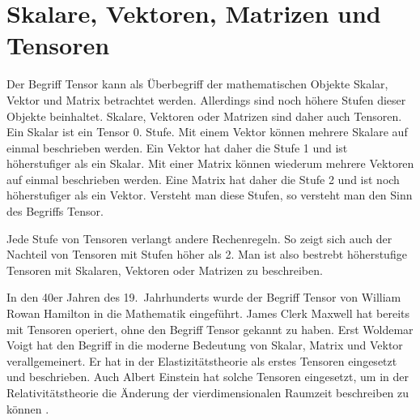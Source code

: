 \section{Skalare, Vektoren, Matrizen und Tensoren\label{spannung:section:Skalare,_Vektoren,_Matrizen_und_Tensoren}}
Der Begriff Tensor kann als Überbegriff der mathematischen Objekte Skalar, Vektor und Matrix betrachtet werden.
%
Allerdings sind noch höhere Stufen dieser Objekte beinhaltet.
Skalare, Vektoren oder Matrizen sind daher auch Tensoren.
Ein Skalar ist ein Tensor 0. Stufe.
%
Mit einem Vektor können mehrere Skalare auf einmal beschrieben werden.
Ein Vektor hat daher die Stufe 1 und ist höherstufiger als ein Skalar.
Mit einer Matrix können wiederum mehrere Vektoren auf einmal beschrieben werden.
Eine Matrix hat daher die Stufe 2 und ist noch höherstufiger als ein Vektor.
Versteht man diese Stufen, so versteht man den Sinn des Begriffs Tensor.

Jede Stufe von Tensoren verlangt andere Rechenregeln.
So zeigt sich auch der Nachteil von Tensoren mit Stufen höher als 2.
Man ist also bestrebt höherstufige Tensoren mit Skalaren, Vektoren oder Matrizen zu beschreiben.

In den 40er Jahren des 19.~Jahrhunderts wurde der Begriff Tensor von William Rowan Hamilton in die Mathematik eingeführt.
%
James Clerk Maxwell hat bereits mit Tensoren operiert, ohne den Begriff Tensor gekannt zu haben.
%
Erst Woldemar Voigt hat den Begriff in die moderne Bedeutung von Skalar, Matrix und Vektor verallgemeinert.
Er hat in der Elastizitätstheorie als erstes Tensoren eingesetzt und beschrieben.
%
Auch Albert Einstein hat solche Tensoren eingesetzt,
%
um in der Relativitätstheorie die Änderung der vierdimensionalen Raumzeit beschreiben zu können
%
%
\cite{spannung:Tensor}.

